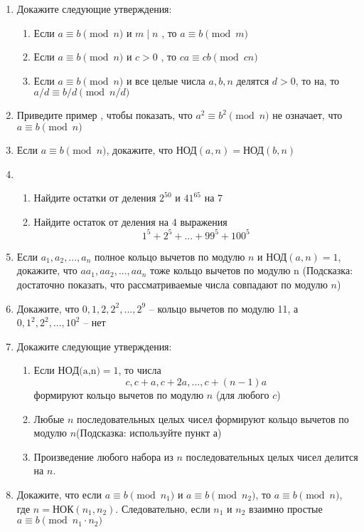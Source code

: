 \documentclass[11pt]{article}
\begin{document}
\begin{enumerate}
	\item Докажите следующие утверждения:
\begin{enumerate}
	\item Если $a \equiv b \pmod n$ и  $m\mid n$ , то $a \equiv b \pmod m$
	\item Если $a \equiv b \pmod n$ и  $c>0$ , то $ca \equiv cb \pmod {cn}$
	\item Если $a \equiv b \pmod n$ и все целые числа $a,b,n$ делятся $d>0$, то на, то  ${a / d \equiv b / d \pmod {n / d}}$
\end{enumerate}
\item Приведите пример , чтобы показать, что $a^{2}\equiv b^{2} \pmod {	n}$ не означает, что $a\equiv b \pmod {n}$
\item Если $a\equiv b \pmod {n}$, докажите, что $\text{НОД} (a,n) = \text{НОД} (b,n)$
\item 
\begin{enumerate}
	\item Найдите остатки от деления $2^{50}$ и $41^{65}$ на $7$
	\item Найдите остаток от деления на $4$ выражения $$1^{5}+2^{5}+...+99^{5}+100^{5}$$ 
	\end{enumerate}
\item Если $a_1, a_2 , ..., a_n$ полное кольцо вычетов по модулю $n$ и $\text{НОД} (a,n) = 1$, докажите, что 
${aa_1,aa_2,...,aa_n}$ тоже кольцо вычетов по модулю n (Подсказка: достаточно показать, что рассматриваемые числа  совпадают по модулю $n$) 
\item Докажите, что $0, 1, 2, 2^{2},...,2^{9}$ -- кольцо вычетов по модулю 11, а $0, 1^{2}, 2^{2},...,10^{2}$ -- нет
\item Докажите следующие утверждения:
\begin{enumerate}
	\item Если $НОД\text{(a,n)} = 1$, то числа $$c,c+a,c+2a,...,c+(n-1)a$$ формируют кольцо вычетов по модулю $n$ (для любого $c$)
	\item Любые $n$ последовательных целых чисел формируют кольцо вычетов по модулю $n$(Подсказка: используйте пункт а)
	\item Произведение любого набора из $n$ последовательных целых чисел делится на $n$.
\end{enumerate}
\item Докажите, что если $a\equiv b \pmod {n_1}$ и $a\equiv b \pmod {n_2}$, то $a\equiv b \pmod {n}$, где $n = \text{НОК}(n_1,n_2)$. Следовательно, если $n_1$ и $n_2$ взаимно простые $a\equiv b \pmod {n_1\cdot n_2}$


\end{enumerate}
\end{document}
